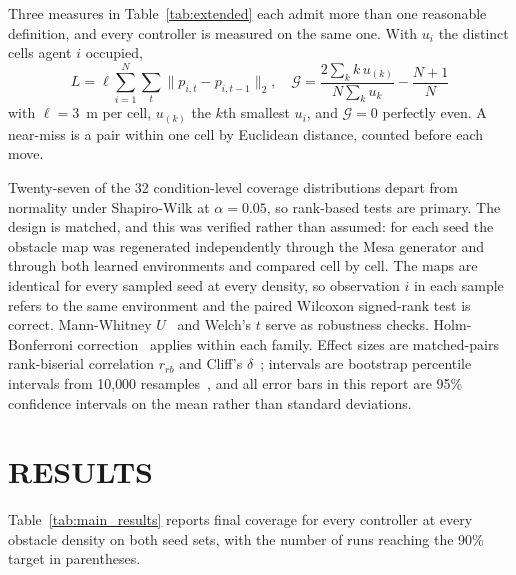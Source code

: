 \documentclass[a4paper, 10pt, conference]{ieeeconf}
\begin{document}
Three measures in Table~\ref{tab:extended} each admit more than one
reasonable definition, and every controller is measured on the same
one. With $u_i$ the distinct cells agent $i$ occupied,
\begin{equation}\label{eq:secondary}
L=\ell\!\!\sum_{i=1}^{N}\sum_{t}\lVert p_{i,t}-p_{i,t-1}\rVert_2,
\quad
\mathcal{G}=\frac{2\sum_{k} k\,u_{(k)}}{N\sum_{k}u_{k}}-\frac{N{+}1}{N}
\end{equation}
with $\ell=3$~m per cell, $u_{(k)}$ the $k$th smallest $u_i$, and
$\mathcal{G}=0$ perfectly even. A near-miss is a pair within one cell
by Euclidean distance, counted before each move.

Twenty-seven of the 32 condition-level coverage distributions depart
from normality under Shapiro-Wilk at $\alpha = 0.05$, so rank-based
tests are primary. The design is matched, and this was verified rather
than assumed: for each seed the obstacle map was regenerated
independently through the Mesa generator and through both learned
environments and compared cell by cell. The maps are identical for
every sampled seed at every density, so observation $i$ in each sample
refers to the same environment and the paired Wilcoxon signed-rank
test is correct. Mann-Whitney $U$~\cite{mann1947} and Welch's $t$
serve as robustness checks. Holm-Bonferroni correction~\cite{holm1979}
applies within each family. Effect sizes are matched-pairs
rank-biserial correlation $r_{rb}$ and Cliff's
$\delta$~\cite{cliff1993}; intervals are bootstrap percentile
intervals from 10{,}000 resamples~\cite{efron1979}, and all error bars
in this report are 95\% confidence intervals on the mean rather than
standard deviations.

\section{RESULTS}\label{sec:results}

Table~\ref{tab:main_results} reports final coverage for every
controller at every obstacle density on both seed sets, with the
number of runs reaching the 90\% target in parentheses.
\end{document}
